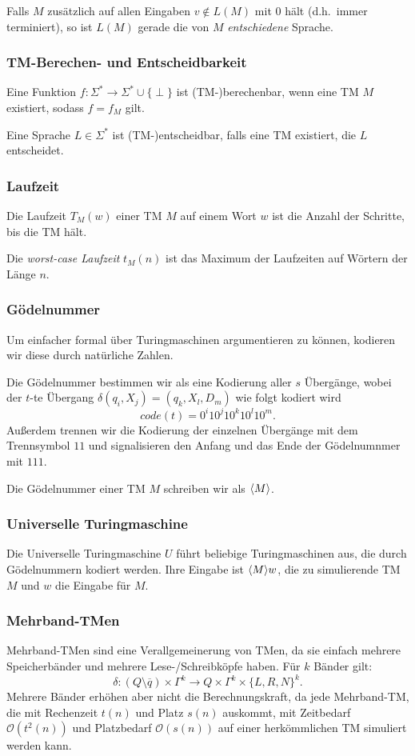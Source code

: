 \documentclass[a4paper,parskip=half*,DIV=7,fontsize=11pt]{scrartcl}
\DeclarePairedDelimiter\goedel{\langle}{\rangle}
\begin{document}
Falls $M$ zusätzlich auf allen Eingaben $v \notin L(M)$ mit 0 hält (d.h.\ immer terminiert), so ist $L(M)$ gerade die von $M$ \emph{entschiedene} Sprache.

\subsubsection{TM-Berechen- und Entscheidbarkeit}
Eine Funktion $f : \Sigma^* \to \Sigma^* \cup \{\perp\}$ ist (TM-)berechenbar, wenn eine TM $M$ existiert, sodass $f = f_M$ gilt.

Eine Sprache $L \in \Sigma^*$ ist (TM-)entscheidbar, falls eine TM existiert, die $L$ entscheidet.

\subsubsection{Laufzeit}

Die Laufzeit $T_M(w)$ einer TM $M$ auf einem Wort $w$ ist die Anzahl der Schritte, bis die TM hält.

Die \emph{worst-case Laufzeit} $t_M(n)$ ist das Maximum der Laufzeiten auf Wörtern der Länge $n$.

\subsubsection{Gödelnummer}
Um einfacher formal über Turingmaschinen argumentieren zu können, kodieren wir diese durch natürliche Zahlen.

Die Gödelnummer bestimmen wir als eine Kodierung aller $s$ Übergänge, wobei der $t$-te Übergang $\delta(q_i, X_j) = (q_k, X_l, D_m)$ wie folgt kodiert wird $$code(t) = 0^i 10^j 10^k 10^l 10^m.$$ Außerdem trennen wir die Kodierung der einzelnen Übergänge mit dem Trennsymbol $11$ und signalisieren den Anfang und das Ende der Gödelnumnmer mit $111$.

Die Gödelnummer einer TM $M$ schreiben wir als $\goedel{M}$.

\subsubsection{Universelle Turingmaschine}
Die Universelle Turingmaschine $U$ führt beliebige Turingmaschinen aus, die durch Gödelnummern kodiert werden. Ihre Eingabe ist $\goedel{M} w$, die zu simulierende TM $M$ und $w$ die Eingabe für $M$.

\subsubsection{Mehrband-TMen}
Mehrband-TMen sind eine Verallgemeinerung von TMen, da sie einfach mehrere Speicherbänder und mehrere Lese-/Schreibköpfe haben. Für $k$ Bänder gilt: 
\[\delta : (Q \setminus \overline{q}) \times \Gamma^k \to Q \times \Gamma^k \times \{L,R,N\}^k.\]
Mehrere Bänder erhöhen aber nicht die Berechnungskraft, da jede Mehrband-TM, die mit Rechenzeit $t(n)$ und Platz $s(n)$ auskommt, mit Zeitbedarf $\mathcal{O}(t^2(n))$ und Platzbedarf $\mathcal{O}(s(n))$ auf einer herkömmlichen TM simuliert werden kann. 
\end{document}
